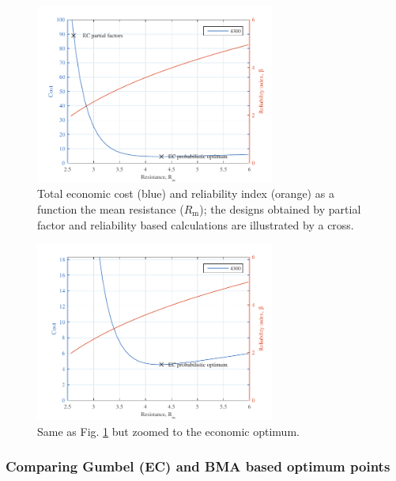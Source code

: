 \begin{figure}[htbp!] 
	\centering    
	\includegraphics[width=0.7\textwidth]{cost_opti_ec_get_ratioeps_total.pdf}
	\caption{Total economic cost (blue) and reliability index (orange) as a function the mean resistance ($R_\mathrm{m}$); the designs obtained by partial factor and reliability based calculations are illustrated by a cross.}
	\label{fig:cost_opti_ec_total}
\end{figure}

\begin{figure}[htbp!] 
	\centering    
	\includegraphics[width=0.7\textwidth]{cost_opti_ec_get_ratioeps_zoom.pdf}
	\caption{Same as Fig. \ref{fig:cost_opti_ec_total} but zoomed to the economic optimum.}
	\label{fig:cost_opti_ec_zoom}
\end{figure}


\subsubsection{Comparing Gumbel (EC) and BMA based optimum points}

